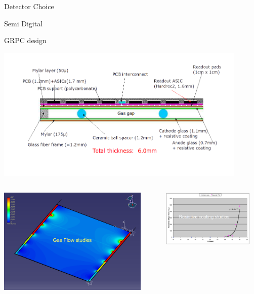 \documentclass[10pt]{beamer}
\begin{document}
\begin{frame}{Detector Choice}
\begin{block}{  Semi Digital}
  \end{block} 

\end{frame}

\begin{frame}{GRPC design}

  \centerline{\includegraphics[width=0.9\textwidth,height=0.4\textheight]{images/GRPCSchema}}
  \pause   

 \begin{columns}
      \begin{column}{0.45\textwidth}
       \centerline{\includegraphics[width=0.9\textwidth]{images/GasFlow}}
      \end{column}
\pause
      \begin{column}{0.45\textwidth}

       \centerline{\includegraphics[width=0.9\textwidth]{images/CoatingStudies}}
      \end{column}
    \end{columns}
  

\end{frame}
\end{document}
